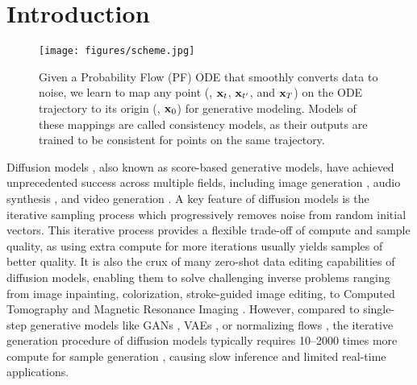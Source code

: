 \section{Introduction}\label{sec:intro}

\begin{figure}[t]
    \centering
    \texttt{[image: figures/scheme.jpg]}
    \caption{Given a {\color{ode} Probability Flow (PF) ODE} that smoothly converts data to noise, we learn to map any point (\eg, ${\mathbf{x}}_t$, ${\mathbf{x}}_{t'}$, and ${\mathbf{x}}_T$) on the ODE trajectory to its origin (\eg, ${\mathbf{x}}_0$) for generative modeling. Models of these mappings are called {\color{model}consistency models}, as their outputs are trained to be consistent for points on the same trajectory.}
    \label{fig:scheme}
\end{figure}

Diffusion models \cite{sohl2015deep,song2019generative,song2020improved,ho2020denoising,song2021scorebased}, also known as score-based generative models, have achieved unprecedented success across multiple fields, including image generation \cite{dhariwal2021diffusion,nichol2021glide,ramesh2022hierarchical,saharia2022photorealistic,rombach2022high}, audio synthesis \cite{kong2020diffwave,chen2021wavegrad,popov2021grad}, and video generation \cite{ho2022video,ho2022imagen}. %
A key feature of diffusion models is the iterative sampling process which progressively removes noise from random initial vectors. This iterative process provides a flexible trade-off of compute and sample quality, as using extra compute for more iterations usually yields samples of better quality. It is also the crux of many zero-shot data editing capabilities of diffusion models, enabling them to solve challenging inverse problems ranging from image inpainting, colorization, stroke-guided image editing, to Computed Tomography and Magnetic Resonance Imaging \cite{song2019generative,song2021scorebased,song2021medical,song2023pseudoinverseguided,kawar2021snips,kawar2022denoising,chung2023diffusion,meng2021sdedit}. However, compared to single-step generative models like GANs \cite{goodfellow2014generative}, VAEs \cite{kingma2013auto,rezende2014stochastic}, or normalizing flows \cite{dinh2014nice,dinh2016density,kingma2018glow}, the iterative generation procedure of diffusion models typically requires 10--2000 times more compute for sample generation \cite{song2020improved,ho2020denoising,song2021scorebased,zhang2022fast,lu2022dpm}, causing slow inference and limited real-time applications.




